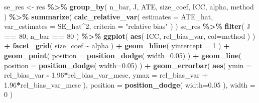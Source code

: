 \documentclass[
]{book}
\newenvironment{Shaded}{\begin{snugshade}}{\end{snugshade}}
\newcommand{\AttributeTok}[1]{\textcolor[rgb]{0.13,0.29,0.53}{#1}}
\newcommand{\DecValTok}[1]{\textcolor[rgb]{0.00,0.00,0.81}{#1}}
\newcommand{\FloatTok}[1]{\textcolor[rgb]{0.00,0.00,0.81}{#1}}
\newcommand{\FunctionTok}[1]{\textcolor[rgb]{0.13,0.29,0.53}{\textbf{#1}}}
\newcommand{\NormalTok}[1]{#1}
\newcommand{\OtherTok}[1]{\textcolor[rgb]{0.56,0.35,0.01}{#1}}
\newcommand{\SpecialCharTok}[1]{\textcolor[rgb]{0.81,0.36,0.00}{\textbf{#1}}}
\newcommand{\StringTok}[1]{\textcolor[rgb]{0.31,0.60,0.02}{#1}}
\begin{document}
\begin{Shaded}
\begin{Highlighting}[]
\NormalTok{se\_res }\OtherTok{\textless{}{-}}\NormalTok{ res }\SpecialCharTok{\%\textgreater{}\%}
  \FunctionTok{group\_by}\NormalTok{( n\_bar, J, ATE, size\_coef, ICC, alpha, method ) }\SpecialCharTok{\%\textgreater{}\%}
  \FunctionTok{summarize}\NormalTok{( }\FunctionTok{calc\_relative\_var}\NormalTok{( }\AttributeTok{estimates =}\NormalTok{ ATE\_hat,}
                     \AttributeTok{var\_estimates =}\NormalTok{ SE\_hat}\SpecialCharTok{\^{}}\DecValTok{2}\NormalTok{,}
                     \AttributeTok{criteria =} \StringTok{"relative bias"}\NormalTok{ ) )}
\NormalTok{se\_res }\SpecialCharTok{\%\textgreater{}\%}
  \FunctionTok{filter}\NormalTok{( J }\SpecialCharTok{==} \DecValTok{80}\NormalTok{, n\_bar }\SpecialCharTok{==} \DecValTok{80}\NormalTok{ ) }\SpecialCharTok{\%\textgreater{}\%}
  \FunctionTok{ggplot}\NormalTok{( }\FunctionTok{aes}\NormalTok{( ICC, rel\_bias\_var, }\AttributeTok{col=}\NormalTok{method ) ) }\SpecialCharTok{+}
  \FunctionTok{facet\_grid}\NormalTok{( size\_coef }\SpecialCharTok{\textasciitilde{}}\NormalTok{ alpha  ) }\SpecialCharTok{+} 
  \FunctionTok{geom\_hline}\NormalTok{( }\AttributeTok{yintercept =} \DecValTok{1}\NormalTok{ ) }\SpecialCharTok{+}
  \FunctionTok{geom\_point}\NormalTok{( }\AttributeTok{position =} \FunctionTok{position\_dodge}\NormalTok{( }\AttributeTok{width=}\FloatTok{0.05}\NormalTok{) ) }\SpecialCharTok{+}
  \FunctionTok{geom\_line}\NormalTok{( }\AttributeTok{position =} \FunctionTok{position\_dodge}\NormalTok{( }\AttributeTok{width=}\FloatTok{0.05}\NormalTok{) ) }\SpecialCharTok{+}
  \FunctionTok{geom\_errorbar}\NormalTok{( }\FunctionTok{aes}\NormalTok{( }\AttributeTok{ymin =}\NormalTok{ rel\_bias\_var }\SpecialCharTok{{-}} \FloatTok{1.96}\SpecialCharTok{*}\NormalTok{rel\_bias\_var\_mcse,}
                      \AttributeTok{ymax =}\NormalTok{ rel\_bias\_var }\SpecialCharTok{+} \FloatTok{1.96}\SpecialCharTok{*}\NormalTok{rel\_bias\_var\_mcse ),}
                 \AttributeTok{position =} \FunctionTok{position\_dodge}\NormalTok{( }\AttributeTok{width=}\FloatTok{0.05}\NormalTok{ ),}
                 \AttributeTok{width =} \DecValTok{0}\NormalTok{ )}
\end{Highlighting}
\end{Shaded}
\end{document}
